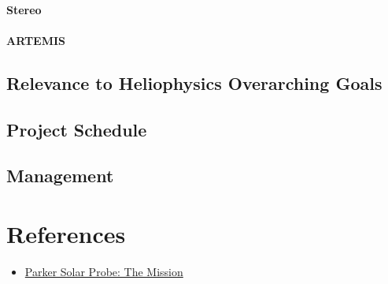 \documentclass[
  letterpaper,
  DIV=11,
  numbers=noendperiod,
  oneside]{scrartcl}
\let\oldparagraph\paragraph
\renewcommand{\paragraph}[1]{\oldparagraph{#1}\mbox{}}
\providecommand{\tightlist}{%
  \setlength{\itemsep}{0pt}\setlength{\parskip}{0pt}}\usepackage{longtable,booktabs,array}
\begin{document}
\paragraph{Stereo}

\paragraph{ARTEMIS}

\subsection{Relevance to Heliophysics Overarching
Goals}\label{relevance-to-heliophysics-overarching-goals}

\subsection{Project Schedule}\label{project-schedule}

\subsection{Management}\label{management}

\section{References}\label{references}

\begin{itemize}
\tightlist
\item
  \href{https://parkersolarprobe.jhuapl.edu/The-Mission/index.php}{Parker
  Solar Probe: The Mission}
\end{itemize}
\end{document}
